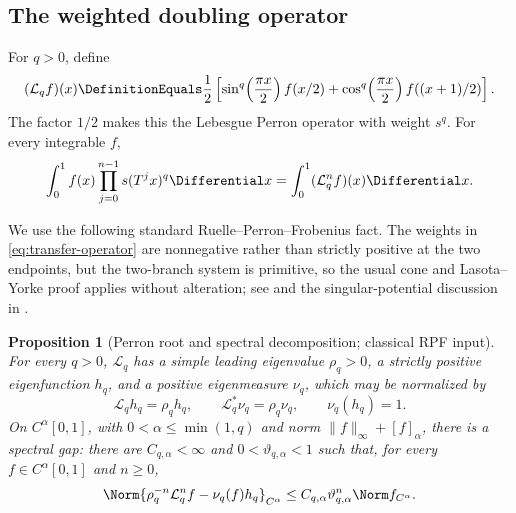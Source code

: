 \documentclass[11pt,oneside]{article}
\numberwithin{equation}{section}
\newtheorem{proposition}[theorem]{Proposition}
\theoremstyle{definition}
\theoremstyle{remark}
\begin{document}
\subsection{The weighted doubling operator}

For $q>0$, define
\begin{equation}
 (\mathcal L_q f)(x)
 \DefinitionEquals\frac12\left[
   \sin^q\!\left(\frac{\pi x}{2}\right)f(x/2)
  +\cos^q\!\left(\frac{\pi x}{2}\right)f((x+1)/2)
 \right].
 \label{eq:transfer-operator}
\end{equation}
The factor $1/2$ makes this the Lebesgue Perron operator with weight $s^q$.
For every integrable $f$,
\begin{equation}
 \int_0^1 f(x)\prod_{j=0}^{n-1}s(T^jx)^q\Differential x
 =\int_0^1(\mathcal L_q^n f)(x)\Differential x.
 \label{eq:transfer-duality}
\end{equation}

We use the following standard Ruelle--Perron--Frobenius fact.  The weights in
\eqref{eq:transfer-operator} are nonnegative rather than strictly positive at the two
endpoints, but the two-branch system is primitive, so the usual cone and
Lasota--Yorke proof applies without alteration; see \cite[Chs.~2--3]{baladi} and the
singular-potential discussion in \cite{fan1997,fan-schmeling-shen}.

\begin{proposition}[Perron root and spectral decomposition; classical RPF input]
\label{prop:RPF}
For every $q>0$, $\mathcal L_q$ has a simple leading eigenvalue
$\rho_q>0$, a strictly positive eigenfunction $h_q$, and a positive eigenmeasure $\nu_q$,
which may be normalized by
\[
 \mathcal L_qh_q=\rho_qh_q,
 \qquad
 \mathcal L_q^*\nu_q=\rho_q\nu_q,
 \qquad
 \nu_q(h_q)=1.
\]
On $C^\alpha[0,1]$, with $0<\alpha\le\min(1,q)$ and norm
$\|f\|_\infty+[f]_\alpha$, there is a spectral gap: there are
$C_{q,\alpha}<\infty$ and $0<\vartheta_{q,\alpha}<1$ such that, for every
$f\in C^\alpha[0,1]$ and $n\ge0$,
\begin{equation}
 \Norm{\rho_q^{-n}\mathcal L_q^nf-\nu_q(f)h_q}_{C^\alpha}
 \le C_{q,\alpha}\vartheta_{q,\alpha}^n\Norm f_{C^\alpha}.
 \label{eq:RPF-convergence}
\end{equation}
\end{proposition}
\end{document}
